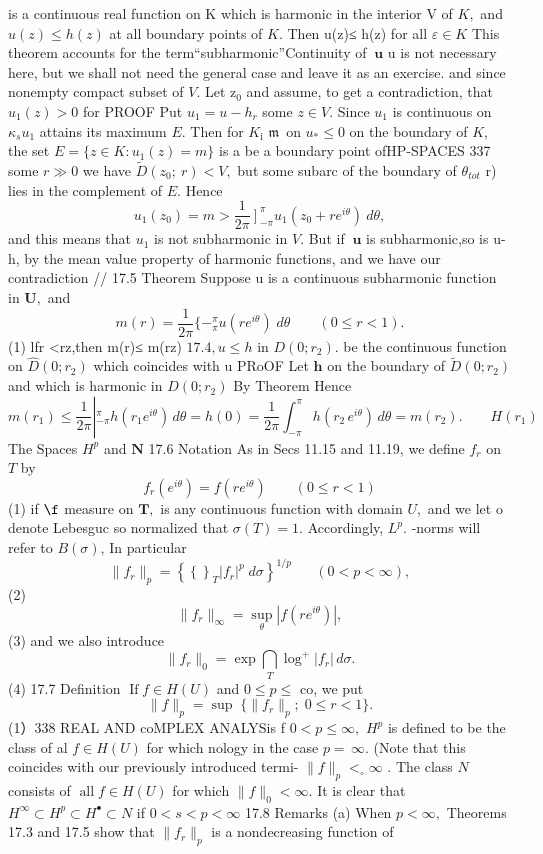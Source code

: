 is a continuous real function on K which is harmonic in the interior V of $K,$ and $u(z)\leq h(z)$ at all boundary points of $K.$ Then u(z)≤ h(z) for all $\scriptstyle{\varepsilon\in K}$ This theorem accounts for the term“subharmonic”Continuity of $\boldsymbol{\ u}$ u is not necessary here, but we shall not need the general case and leave it as an exercise. and since nonempty compact subset of $V.$ Let $\mathrm{z}_{0}$ and assume, to get a contradiction, that $u_{1}(z)>0$ for PROOF Put $u_{1}=u-h_{r}$ some $z\in V.$ Since $u_{1}$ is continuous on $\scriptstyle\kappa_{s}u_{1}$ attains its maximum $E.$ Then for $K_{\mathrm{{i}}}$ ${\mathfrak{m}}\,$ on $u_{*}\leq0$ on the boundary of $K,$ the set $E=\{z\in K:u_{1}(z)=m\}$ is a be a boundary point ofHP-SPACES 337 some $\scriptstyle{r\gg0}$ we have ${\tilde{D}}(z_{0};\ r)<V,$ but some subarc of the boundary of $\theta_{t o t}$ r) lies in the complement of $\displaystyle E.$ Hence $$ u_{1}(z_{0})=m>\frac{1}{2\pi}\left.\right]_{-\pi}^{\pi}u_{1}(z_{0}+r e^{i\theta})~d\theta, $$ and this means that $u_{1}$ is not subharmonic in $V.$ But if $\boldsymbol{\ u}$ is subharmonic,so is u-h, by the mean value property of harmonic functions, and we have our contradiction // 17.5 Theorem Suppose u is a continuous subharmonic function in ${\boldsymbol{U}},$ and $$ m(r)=\frac{1}{2\pi} \{-_{\pi}^{\pi}u(r e^{i\theta})\;d\theta\qquad(0\leq r<1). $$ (1) lfr <rz,then m(r)≤ m(rz) $17.4,u\leq h$ in $D(0;r_{2}).$ be the continuous function on $\scriptstyle{{\hat{D}}(0;r_{2})}$ which coincides with u PRoOF Let ${\boldsymbol{h}}$ on the boundary of ${\tilde{D}}(0;r_{2})$ and which is harmonic in $\scriptstyle{D(0;r_{2})}$ By Theorem Hence $$ m(r_{1})\leq\frac{1}{2\pi}\left|_{-\pi}^{\pi}h(r_{1}e^{i\theta})\,d\theta=h(0)=\frac{1}{2\pi}\int_{-\pi}^{\pi}h(r_{2}\,e^{i\theta})\,d\theta=m(r_{2}).\qquad H(r_{1})\right. $$ The Spaces $H^{p}$ and ${\boldsymbol{N}}$ 17.6 Notation As in Secs 11.15 and 11.19, we define $f_{r}$ on ${\mathbf{}}T$ by $$ f_{r}(e^{i\theta})=f(r e^{i\theta})\qquad(0\leq r<1) $$ (1) if $\boldsymbol{\f}$ measure on ${\boldsymbol{T}},$ is any continuous function with domain $U,$ and we let o denote Lebesguc so normalized that $\sigma(T)=1.$ Accordingly, $L^{p}.$ -norms will refer to $B(\sigma),\,\mathrm{In}$ particular $$ \|f_{r}\|_{p}=\left\{\left\{\right\}_{T}|f_{r}|^{p}\;d\sigma\right\}^{1/p}\;\;\;\;\;\;(0<p<\infty), $$ (2) $$ \|f_{r}\|_{\infty}=\operatorname*{sup}_{\theta}|f(r e^{i\theta})|, $$ (3) and we also introduce $$ \|f_{r}\|_{0}=\exp\bigcap_{T}\!\log^{+}|f_{r}|\,d\sigma. $$ (4) 17.7 Definition $\operatorname{If}f\in H(U)$ and $0\leq p\leq$ co, we put $$ \|f\|_{p}=\operatorname*{sup}\;\{\|f_{r}\|_{p};\;0\leq r<1\}. $$ (1）338 REAL AND coMPLEX ANALYSis f $0<p\leq\infty,$ $H^{p}$ is defined to be the class of al $f\in H(U)$ for which nology in the case $p=\,\infty.$ (Note that this coincides with our previously introduced termi- $\|f\|_{p}<_{\circ}\infty$ . The class ${\mathbf{}}N$ consists of $\operatorname{all}f\in H(U)$ for which $\|f\|_{0}<\infty.$ It is clear that $H^{\infty}\subset H^{p}\subset H^{\bullet}\subset N$ if $0<s<p<\infty$ 17.8 Remarks (a) When $p<\infty,$ Theorems 17.3 and 17.5 show that $\|f_{r}\|_{p}$ is a nondecreasing function of 